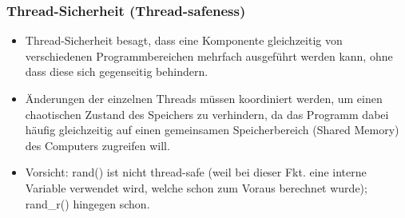 \subsubsection{Thread-Sicherheit (Thread-safeness)}
\begin{itemize}
\item Thread-Sicherheit besagt, dass eine Komponente gleichzeitig von verschiedenen Programmbereichen mehrfach ausgeführt werden kann, ohne dass diese sich gegenseitig behindern.
\item Änderungen der einzelnen Threads müssen koordiniert werden, um einen chaotischen Zustand des Speichers zu verhindern, da das Programm dabei häufig gleichzeitig auf einen gemeinsamen Speicherbereich (Shared Memory) des Computers zugreifen will.
\item Vorsicht: rand() ist nicht thread-safe (weil bei dieser Fkt. eine interne Variable verwendet wird, welche schon zum Voraus berechnet wurde); rand\_r() hingegen schon. 
\end{itemize}
